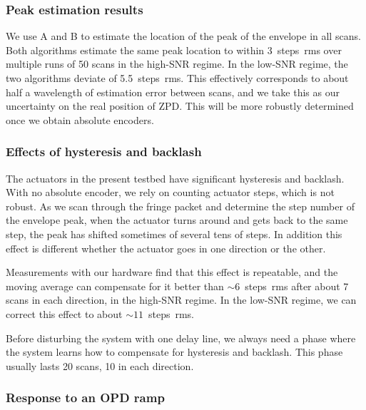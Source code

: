 \subsubsection{Peak estimation results}
We use A and B to estimate the location of the peak of the envelope in all scans. Both algorithms estimate the same peak location to within 3~steps~rms over multiple runs of 50 scans in the high-SNR regime. In the low-SNR regime, the two algorithms deviate of 5.5~steps~rms. This effectively corresponds to about half a wavelength of estimation error between scans, and we take this as our uncertainty on the real position of ZPD. This will be more robustly determined once we obtain absolute encoders. 

\subsubsection{Effects of hysteresis and backlash}

The actuators in the present testbed have significant hysteresis and backlash. With no absolute encoder, we rely on counting actuator steps, which is not robust. As we scan through the fringe packet and determine the step number of the envelope peak, when the actuator turns around and gets back to the same step, the peak has shifted sometimes of several tens of steps. In addition this effect is different whether the actuator goes in one direction or the other. 

Measurements with our hardware find that this effect is repeatable, and the moving average can compensate for it better than $\sim 6$~steps~rms after about 7 scans in each direction, in the high-SNR regime. In the low-SNR regime, we can correct this effect to about $\sim 11$~steps~rms.

Before disturbing the system with one delay line, we always need a phase where the system learns how to compensate for hysteresis and backlash. This phase usually lasts 20 scans, 10 in each direction.

\subsubsection{Response to an OPD ramp}

